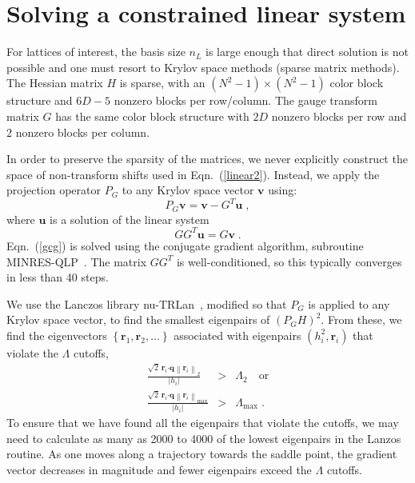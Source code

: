 \documentclass[preprint,aps,prd]{revtex4-2}
\newcommand{\be}{\begin{equation}}
\newcommand{\eq}{\end{equation}}
\newcommand{\heigen}{h}
\begin{document}
\section{Solving a constrained linear system}
\label{krylov}

For lattices of interest, the basis size $n_L$ is large enough
that direct solution is not possible and one must resort to Krylov
space methods (sparse matrix methods).
The Hessian matrix $H$ is sparse, with an $(N^2-1)\times(N^2-1)$
color block structure and $6D-5$ nonzero blocks per row/column.
The gauge transform matrix $G$ has the same color block structure
with $2 D$ nonzero blocks per row and $2$ nonzero blocks per column.

In order to preserve the sparsity of the matrices, we never
explicitly construct the space of non-transform shifts used in
Eqn.~(\ref{linear2}).  Instead, we apply the projection
operator $P_G$ to any Krylov space vector $\mathbf{v}$ using:
\be
    P_G \mathbf{v} = \mathbf{v} - G^T \mathbf{u} \; ,
\eq
where $\mathbf{u}$ is a solution of the linear system
\be
  G G^T \mathbf{u} = G \mathbf{v} \; .\label{gcg}
\eq
Eqn.~(\ref{gcg}) is solved using the conjugate gradient
algorithm, subroutine MINRES-QLP~\cite{choi_algorithm_2014}.
The matrix $G G^T$ is well-conditioned, so this typically converges
in less than 40 steps.

We use the Lanczos library nu-TRLan~\cite{yamazaki_adaptive_2010},
modified so that $P_G$ is applied to any Krylov space vector, to
find the smallest eigenpairs of $\left(P_G H\right)^2$.  From these, we find
the eigenvectors $\left\{\mathbf{r}_1, \mathbf{r}_2, \ldots\right\}$
associated with eigenpairs $\left(\heigen_i^2, \mathbf{r}_i\right)$
that violate the $\Lambda$ cutoffs,
%
\begin{eqnarray}
   \frac{\sqrt{2}\, \mathbf{r}_i \mathbf{\cdot} \mathbf{q}
   \left\lVert \mathbf{r}_i\right\rVert_2}{\left|\heigen_i\right| }
     &>& \Lambda_2  \quad\mbox{or} \\
   \frac{\sqrt{2}\, \mathbf{r}_i\mathbf{\cdot} \mathbf{q}
   \left\lVert \mathbf{r}_i\right\rVert_\mathrm{max}}{\left|\heigen_i\right| }
     &>& \Lambda_\mathrm{max} \; .
\end{eqnarray}
%
To ensure that we have found all the eigenpairs that violate the cutoffs,
we may need to calculate as many as 2000 to 4000 of the lowest eigenpairs
in the Lanzos routine.  As one moves along a trajectory towards the
saddle point, the gradient vector decreases in magnitude and fewer eigenpairs
exceed the $\Lambda$ cutoffs.
\end{document}
